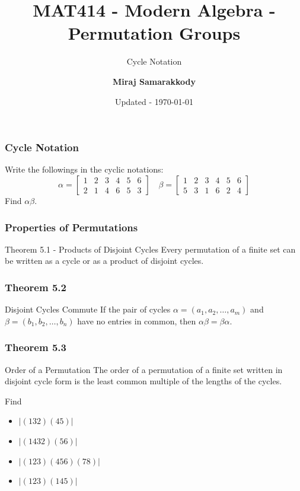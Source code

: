 \documentclass{beamer}
\title{MAT414 - Modern Algebra - Permutation Groups}
\subtitle{Cycle Notation \cite{JAG2017}}
\author{\textbf{Miraj Samarakkody}}
\institute{Tougaloo College}
\date{Updated - \today}
\begin{document}
\begin{frame}
    \titlepage
\end{frame}




\begin{frame}
    \frametitle{Cycle Notation}

    Write the followings in the cyclic notations:
    \[
    \alpha = \begin{bmatrix}
        1 & 2 & 3& 4 & 5 & 6\\
        2& 1& 4 & 6 & 5 & 3
    \end{bmatrix}\quad \beta =  \begin{bmatrix}
        1 & 2 & 3& 4 & 5 & 6\\
        5& 3& 1 & 6 & 2 & 4
    \end{bmatrix}
    \] \pause
    Find \(\alpha \beta\). 

\end{frame}

\begin{frame}
    \frametitle{Properties of Permutations}

    \begin{block}{Theorem 5.1 - Products of Disjoint Cycles}
        Every permutation of a finite set can be written as a cycle or as a product of disjoint cycles. 
    \end{block}

\end{frame}

\begin{frame}
    \frametitle{Theorem 5.2}

    \begin{block}{Disjoint Cycles Commute}
        If the pair of cycles \(\alpha = (a_1,a_2, \dots, a_m)\) and \(\beta =(b_1, b_2, \dots, b_n)\) have no entries in common, then \(\alpha \beta = \beta \alpha\).
    \end{block}

\end{frame}

\begin{frame}
    \frametitle{Theorem 5.3}

    \begin{block}{Order of a Permutation}
        The order of a permutation of a finite set written in disjoint cycle form is the least common multiple of the lengths of the cycles. 
    \end{block}\pause

\vspace{0.2in}
    Find \begin{itemize}
        \item \(|(132)(45)|\)
        \item \(|(1432)(56)|\)
        \item \(|(123)(456)(78)|\)
        \item \(|(123)(145)|\)
    \end{itemize}

\end{frame}
\end{document}
